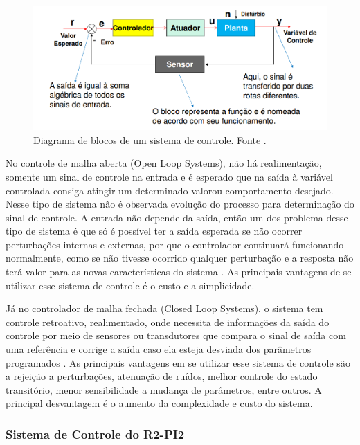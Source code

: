 		\begin{figure}[H]
			\centering
			\includegraphics[scale=0.4]{figuras/diagrama_blocos_controle.png}
			\caption{Diagrama de blocos de um sistema de controle. Fonte \cite{mello}.}
			\label{img:diagrama_sistema_controle}
		\end{figure}

		No controle de malha aberta (Open Loop Systems), não há realimentação, somente um sinal de controle na entrada e é esperado que na saída à variável controlada consiga atingir um determinado valorou comportamento desejado. Nesse tipo de sistema não é observada evolução do processo para determinação do sinal de controle. A entrada não depende da saída, então um dos problema desse tipo de sistema é que só é possível ter a saída esperada se não ocorrer perturbações internas e externas, por que o controlador continuará funcionando normalmente, como se não tivesse ocorrido qualquer perturbação e a resposta não terá valor para as novas características do sistema \cite{silva}. As principais vantagens de se utilizar esse sistema de controle é o custo e a simplicidade.

		Já no controlador de malha fechada (Closed Loop Systems), o sistema tem controle retroativo, realimentado, onde necessita de informações da saída do controle por meio de sensores ou transdutores que compara o sinal de saída com uma referência e corrige a saída caso ela esteja desviada dos parâmetros programados \cite{silva}. As principais vantagens em se utilizar esse sistema de controle são a rejeição a perturbações, atenuação de ruídos, melhor controle do estado transitório, menor sensibilidade a mudança de parâmetros, entre outros. A principal desvantagem é o aumento da complexidade e custo do sistema.

		\subsubsection{Sistema de Controle do R2-PI2}

